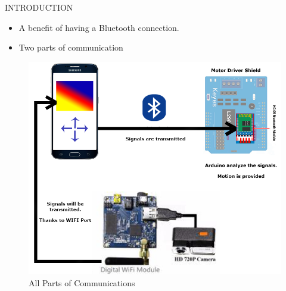 \documentclass[xcolor=table, 9pt]{beamer}
\begin{document}


\begin{frame}{INTRODUCTION}
\begin{itemize}
\item A benefit of having a Bluetooth connection.
\item Two parts of communication
\end{itemize}
\end{frame}




\begin{frame}
\begin{figure}
\includegraphics[width=0.70\linewidth]{bluewifisheme.png}
\caption{All Parts of Communications}
\end{figure}
\end{frame}


\end{document}
